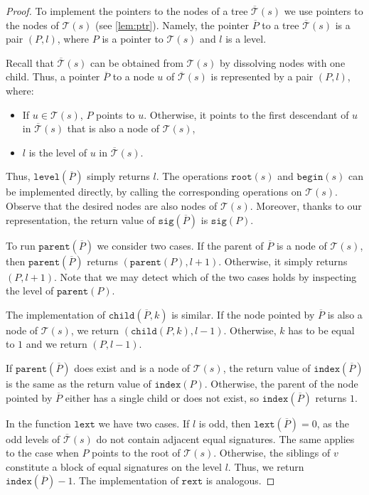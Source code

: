 \documentclass[a4paper]{article}
\theoremstyle{remark}
\newcommand{\stree}{\mathcal{T}}
\newcommand{\ustree}{\mathcal{\overline{T}}}
\newcommand{\itroot}{\mathtt{root}}
\newcommand{\itbegin}{\mathtt{begin}}
\newcommand{\itparent}{\mathtt{parent}}
\newcommand{\itchild}{\mathtt{child}}
\newcommand{\itindex}{\mathtt{index}}
\newcommand{\itlevel}{\mathtt{level}}
\newcommand{\itsig}{\mathtt{sig}}
\newcommand{\itrext}{\mathtt{rext}}
\newcommand{\itlext}{\mathtt{lext}}
\begin{document}
\begin{proof}
To implement the pointers to the nodes of a tree $\ustree(s)$ we use pointers to the nodes of $\stree(s)$ (see \cref{lem:ptr}).
Namely, the pointer $\overline{P}$ to a tree $\ustree(s)$ is a pair $(P, l)$, where $P$ is a pointer to $\stree(s)$ and $l$ is a level.

Recall that $\ustree(s)$ can be obtained from $\stree(s)$ by dissolving nodes with one child.
Thus, a pointer $\overline{P}$ to a node $u$ of $\ustree(s)$ is represented by a pair $(P, l)$, where:
\begin{itemize}
\item If $u\in\stree(s)$, $P$ points to $u$. Otherwise, it points to the first descendant
  of $u$ in $\ustree(s)$ that is also a node of $\stree(s)$,
\item $l$ is the level of $u$ in $\ustree(s)$.
\end{itemize}

Thus, $\itlevel(\overline{P})$ simply returns $l$.
The operations $\itroot(s)$ and $\itbegin(s)$ can be implemented directly, by calling the corresponding operations on $\stree(s)$.
Observe that the desired nodes are also nodes of $\stree(s)$.
Moreover, thanks to our representation, the return value of $\itsig(\overline{P})$ is $\itsig(P)$.

To run $\itparent(\overline{P})$ we consider two cases.
If the parent of $\overline{P}$ is a node of $\stree(s)$, then $\itparent(\overline{P})$ returns $(\itparent(P), l+1)$.
Otherwise, it simply returns $(P, l+1)$.
Note that we may detect which of the two cases holds by inspecting the level of $\itparent(P)$.

The implementation of $\itchild(\overline{P}, k)$ is similar.
If the node pointed by $\overline{P}$ is also a node of $\stree(s)$, we return $(\itchild(P, k), l-1)$.
Otherwise, $k$ has to be equal to $1$ and we return $(P, l-1)$.

If $\itparent(\overline{P})$ does exist and is a node of $\stree(s)$, the return value of $\itindex(\overline{P})$ is the same as the return value of $\itindex(P)$.
Otherwise, the parent of the node pointed by $\overline{P}$ either has a single child or does not exist, so $\itindex(\overline{P})$ returns $1$.

In the function $\itlext$ we have two cases.
If $l$ is odd, then $\itlext(\overline{P})=0$, as the odd
levels of $\ustree(s)$ do not contain adjacent equal signatures.
The same applies to the case when $P$ points to the root of $\stree(s)$.
Otherwise, the siblings of $v$ constitute a block of equal signatures
on the level $l$.
Thus, we return $\itindex(\overline{P})-1$.
The implementation of $\itrext$ is analogous.


\end{proof}
\end{document}
